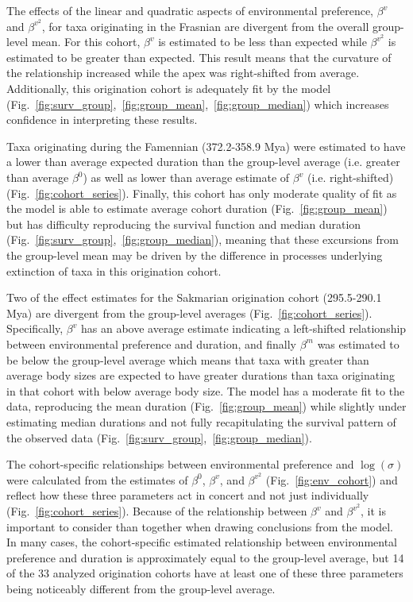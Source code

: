 \documentclass[11pt]{article}
\begin{document}
The effects of the linear and quadratic aspects of environmental preference, \(\beta^{v}\) and \(\beta^{v^{2}}\), for taxa originating in the Frasnian are divergent from the overall group-level mean. For this cohort, \(\beta^{v}\) is estimated to be less than expected while \(\beta^{v^{2}}\) is estimated to be greater than expected. This result means that the curvature of the relationship increased while the apex was right-shifted from average. Additionally, this origination cohort is adequately fit by the model (Fig.~\ref{fig:surv_group},~\ref{fig:group_mean},~\ref{fig:group_median}) which increases confidence in interpreting these results.

Taxa originating during the Famennian (372.2-358.9 Mya) were estimated to have a lower than average expected duration than the group-level average (i.e. greater than average \(\beta^{0}\)) as well as lower than average estimate of \(\beta^{v}\) (i.e. right-shifted) (Fig.~\ref{fig:cohort_series}). Finally, this cohort has only moderate quality of fit as the model is able to estimate average cohort duration (Fig.~\ref{fig:group_mean}) but has difficulty reproducing the survival function and median duration (Fig.~\ref{fig:surv_group},~\ref{fig:group_median}), meaning that these excursions from the group-level mean may be driven by the difference in processes underlying extinction of taxa in this origination cohort.

Two of the effect estimates for the Sakmarian origination cohort (295.5-290.1 Mya) are divergent from the group-level averages (Fig.~\ref{fig:cohort_series}). Specifically, \(\beta^{v}\) has an above average estimate indicating a left-shifted relationship between environmental preference and duration, and finally \(\beta^{m}\) was estimated to be below the group-level average which means that taxa with greater than average body sizes are expected to have greater durations than taxa originating in that cohort with below average body size. The model has a moderate fit to the data, reproducing the mean duration (Fig.~\ref{fig:group_mean}) while slightly under estimating median durations and not fully recapitulating the survival pattern of the observed data (Fig.~\ref{fig:surv_group},~\ref{fig:group_median}).


The cohort-specific relationships between environmental preference and \(\log(\sigma)\) were calculated from the estimates of \(\beta^{0}\), \(\beta^{v}\), and \(\beta^{v^{2}}\) (Fig.~\ref{fig:env_cohort}) and reflect how these three parameters act in concert and not just individually (Fig.~\ref{fig:cohort_series}). Because of the relationship between \(\beta^{v}\) and \(\beta^{v^{2}}\), it is important to consider than together when drawing conclusions from the model. In many cases, the cohort-specific estimated relationship between environmental preference and duration is approximately equal to the group-level average, but 14 of the 33 analyzed origination cohorts have at least one of these three parameters being noticeably different from the group-level average. 
\end{document}
